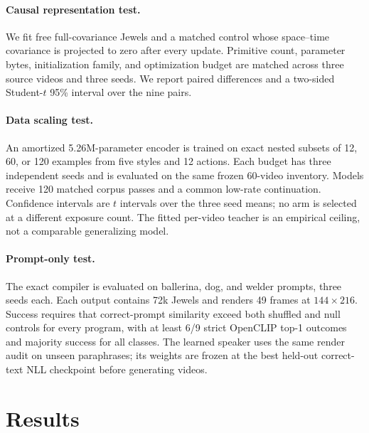 \documentclass{article}
\begin{document}
\paragraph{Causal representation test.}
We fit free full-covariance Jewels and a matched control whose space--time covariance is projected to
zero after every update. Primitive count, parameter bytes, initialization family, and optimization
budget are matched across three source videos and three seeds. We report paired differences and a
two-sided Student-$t$ 95\% interval over the nine pairs.

\paragraph{Data scaling test.}
An amortized 5.26M-parameter encoder is trained on exact nested subsets of 12, 60, or 120 examples
from five styles and 12 actions. Each budget has three independent seeds and is evaluated on the
same frozen 60-video inventory. Models receive 120 matched corpus passes and a common low-rate
continuation. Confidence intervals are $t$ intervals over the three seed means; no arm is selected
at a different exposure count. The fitted per-video teacher is an empirical ceiling, not a
comparable generalizing model.

\paragraph{Prompt-only test.}
The exact compiler is evaluated on ballerina, dog, and welder prompts, three seeds each. Each output
contains 72k Jewels and renders 49 frames at $144\times216$. Success requires that correct-prompt
similarity exceed both shuffled and null controls for every program, with at least 6/9 strict
OpenCLIP top-1 outcomes and majority success for all classes. The learned speaker uses the same
render audit on unseen paraphrases; its weights are frozen at the best held-out correct-text NLL
checkpoint before generating videos.

\section{Results}
\end{document}
